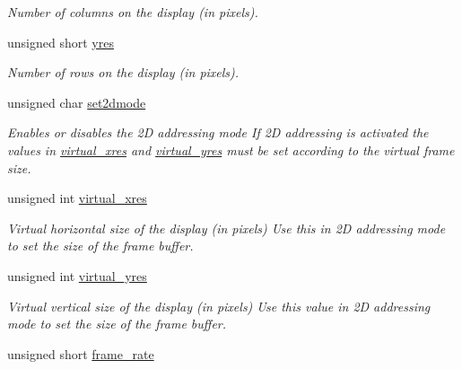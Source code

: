\begin{CompactItemize}
\begin{CompactList}\small\item\em Number of columns on the display (in pixels). \item\end{CompactList}\item 
\hypertarget{structlcdc__configuration__s_6504fea2287f932252a4a7dafbced98f}{
unsigned short \hyperlink{structlcdc__configuration__s_6504fea2287f932252a4a7dafbced98f}{yres}}
\label{structlcdc__configuration__s_6504fea2287f932252a4a7dafbced98f}

\begin{CompactList}\small\item\em Number of rows on the display (in pixels). \item\end{CompactList}\item 
unsigned char \hyperlink{structlcdc__configuration__s_67cfa60b1c4a0f5ac452de527f7d3563}{set2dmode}
\begin{CompactList}\small\item\em Enables or disables the 2D addressing mode If 2D addressing is activated the values in \hyperlink{structlcdc__configuration__s_0b732746f63d5191f561b71be3f0d377}{virtual\_\-xres} and \hyperlink{structlcdc__configuration__s_26201aad2ad05301e6dd06ed5c174bbe}{virtual\_\-yres} must be set according to the virtual frame size. \item\end{CompactList}\item 
\hypertarget{structlcdc__configuration__s_0b732746f63d5191f561b71be3f0d377}{
unsigned int \hyperlink{structlcdc__configuration__s_0b732746f63d5191f561b71be3f0d377}{virtual\_\-xres}}
\label{structlcdc__configuration__s_0b732746f63d5191f561b71be3f0d377}

\begin{CompactList}\small\item\em Virtual horizontal size of the display (in pixels) Use this in 2D addressing mode to set the size of the frame buffer. \item\end{CompactList}\item 
\hypertarget{structlcdc__configuration__s_26201aad2ad05301e6dd06ed5c174bbe}{
unsigned int \hyperlink{structlcdc__configuration__s_26201aad2ad05301e6dd06ed5c174bbe}{virtual\_\-yres}}
\label{structlcdc__configuration__s_26201aad2ad05301e6dd06ed5c174bbe}

\begin{CompactList}\small\item\em Virtual vertical size of the display (in pixels) Use this value in 2D addressing mode to set the size of the frame buffer. \item\end{CompactList}\item 
\hypertarget{structlcdc__configuration__s_a39f4d0126fa4216476e6407781dab43}{
unsigned short \hyperlink{structlcdc__configuration__s_a39f4d0126fa4216476e6407781dab43}{frame\_\-rate}}
\label{structlcdc__configuration__s_a39f4d0126fa4216476e6407781dab43}


\end{CompactItemize}

